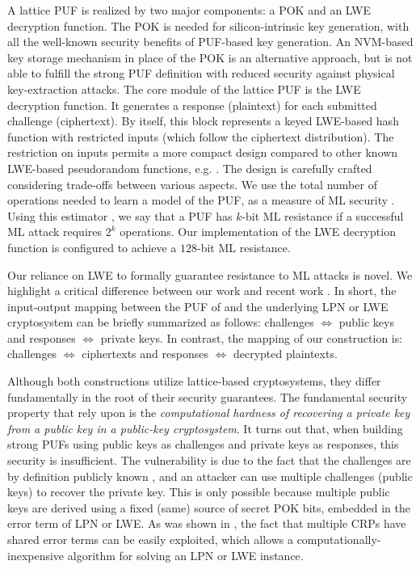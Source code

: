 A lattice PUF is realized by two major components: a POK and an LWE decryption function. 
The POK is needed for silicon-intrinsic key generation, with all the well-known security benefits of PUF-based key generation. 
An NVM-based key storage mechanism in place of the POK is an alternative approach, but is not able to fulfill the strong PUF definition with reduced security against physical key-extraction attacks.
The core module of the lattice PUF is the LWE decryption function.
It generates a response (plaintext) for each submitted challenge (ciphertext). 
By itself, this block represents a keyed LWE-based hash function with restricted inputs (which follow the ciphertext distribution). 
The restriction on inputs permits a more compact design compared to other known LWE-based pseudorandom functions, e.g. \cite{brenner2014fpga}.
The design is carefully crafted considering trade-offs between various aspects.
We use the total number of operations needed to learn a model of the PUF, as a measure of ML security \cite{lindner2011better, micciancio2009lattice, albrecht2015concrete}. 
Using this estimator \cite{albrecht2015concrete}, we say that a PUF has $k$-bit ML resistance if a successful ML attack requires $2^k$ operations. 
Our implementation of the LWE decryption function is configured to achieve a $128$-bit ML resistance.

Our reliance on LWE to formally guarantee resistance to ML attacks is novel.
We highlight a critical difference between our work and recent work \cite{herder2017trapdoor,jin2017fpga}.
In short, the input-output mapping between the PUF of \cite{herder2017trapdoor,jin2017fpga} and the underlying LPN or LWE cryptosystem can be briefly summarized as follows: 
 challenges $\Longleftrightarrow$ public keys and responses $\Longleftrightarrow$  private keys. In contrast, the mapping of our construction is: challenges $\Longleftrightarrow$ ciphertexts and responses $\Longleftrightarrow$ decrypted plaintexts.

Although both constructions utilize lattice-based cryptosystems, they differ fundamentally in the root of their security guarantees.
The fundamental security property that \cite{fuller2013computational} rely upon is the \emph{computational hardness of recovering a private key from a public key in a public-key cryptosystem}. 
It turns out that, when building strong PUFs using public keys as challenges and private keys as responses, this security is insufficient. 
The vulnerability is due to the fact that the challenges are by definition publicly known \cite{fuller2013computational,herder2017trapdoor,jin2017fpga}, and an attacker can use multiple challenges (public keys) to recover the private key. 
This is only possible because multiple public keys are derived using a fixed (same) source of secret POK bits, embedded in the error term of LPN or LWE. 
As was shown in \cite{apon2017efficient}, the fact that multiple CRPs have shared error terms can be easily exploited, which allows a computationally-inexpensive algorithm for solving an LPN or LWE instance. 

